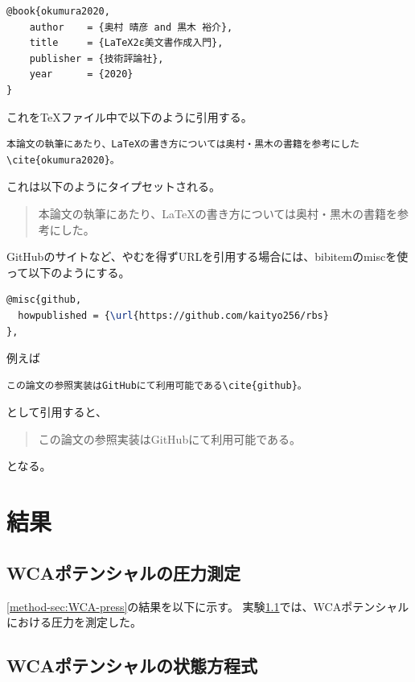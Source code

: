 \documentclass[titlepage]{jsreport}
\begin{document}
\begin{lstlisting}[language=TeX]
@book{okumura2020,
    author    = {奥村 晴彦 and 黒木 裕介},
    title     = {LaTeX2ε美文書作成入門},
    publisher = {技術評論社},
    year      = {2020}
}
\end{lstlisting}

これをTeXファイル中で以下のように引用する。

\begin{verbatim}
本論文の執筆にあたり、LaTeXの書き方については奥村・黒木の書籍を参考にした\cite{okumura2020}。
\end{verbatim}

これは以下のようにタイプセットされる。
\begin{quotation}
    本論文の執筆にあたり、LaTeXの書き方については奥村・黒木の書籍を参考にした\cite{okumura2020}。
\end{quotation}


GitHubのサイトなど、やむを得ずURLを引用する場合には、bibitemのmiscを使って以下のようにする。

\begin{lstlisting}[language=TeX]
@misc{github,
  howpublished = {\url{https://github.com/kaityo256/rbs}
},
\end{lstlisting}

例えば

\begin{verbatim}
この論文の参照実装はGitHubにて利用可能である\cite{github}。
\end{verbatim}
として引用すると、

\begin{quotation}
    この論文の参照実装はGitHubにて利用可能である\cite{github}。
\end{quotation}
となる。




\chapter{結果} \label{chap:results}

\section{WCAポテンシャルの圧力測定}\label{results-sec:WCA-press}
\ref{method-sec:WCA-press}の結果を以下に示す。
実験\ref{results-sec:WCA-press}では、WCAポテンシャルにおける圧力を測定した。


\section{WCAポテンシャルの状態方程式}
\end{document}
